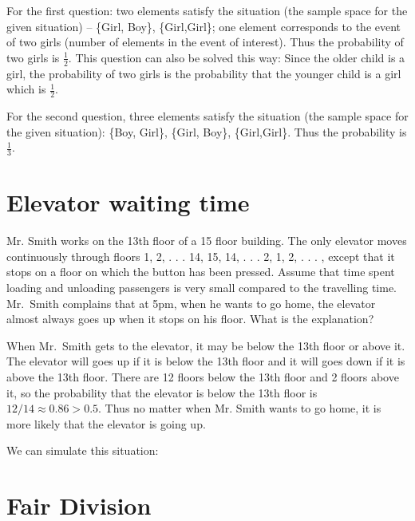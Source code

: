 For the first question: two elements satisfy the situation (the sample space for the given situation) -- \{Girl, Boy\},
\{Girl,Girl\}; one element corresponds to the event of two girls (number of elements in the event of interest). Thus the probability of two girls is $\frac{1}{2}$. This question can also be solved this way: Since the older child is a girl, the probability of two girls is the probability that the younger child is a girl which is $\frac{1}{2}$.

For the second question, three elements satisfy the situation (the sample space for the given situation): \{Boy, Girl\},
\{Girl, Boy\}, \{Girl,Girl\}. Thus the probability is $\frac{1}{3}$.

\hypertarget{example-elevator-waiting-time}{%
  \section{Elevator waiting
    time}\label{example-elevator-waiting-time}}
\begin{example}
  Mr. Smith works on the 13th floor of a 15 floor building. The only elevator
  moves continuously through floors 1, 2, . . . 14, 15, 14, . . . 2, 1, 2,
  . . . , except that it stops on a floor on which the button has been
  pressed. Assume that time spent loading and unloading passengers is very small
  compared to the travelling time.  Mr.~Smith complains that at 5pm, when he
  wants to go home, the elevator almost always goes up when it stops on his
  floor. What is the explanation?
\end{example}

When Mr.~Smith gets to the elevator, it may be below the 13th floor or above it. The elevator will goes up if it is below the 13th floor and it will goes down if it is above the 13th floor. There are 12 floors below the 13th floor and 2 floors above it, so the probability that the elevator is below the 13th floor is $12/14\approx0.86>0.5$. Thus no matter when Mr. Smith wants to go home, it is more likely that the elevator is going up.

We can simulate this situation:  






\hypertarget{Fair-Division}{%
  \section{Fair Division}\label{Fair-Division}}

